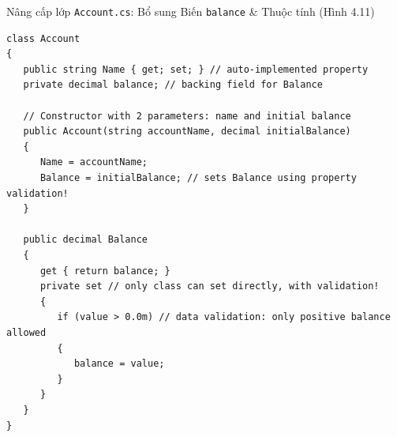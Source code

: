 \documentclass[aspectratio=169, 10pt]{beamer}
\begin{document}
\begin{frame}[fragile]{Nâng cấp lớp \texttt{Account.cs}: Bổ sung Biến \texttt{balance} \& Thuộc tính (Hình 4.11)}
  \begin{tcolorbox}[colback=CodeBg,colframe=UniNavy,title=\textbf{Account.cs with Balance and Validation (Trích Fig. 4.11)},fonttitle=\small\bfseries]
\begin{lstlisting}
class Account
{
   public string Name { get; set; } // auto-implemented property
   private decimal balance; // backing field for Balance

   // Constructor with 2 parameters: name and initial balance
   public Account(string accountName, decimal initialBalance)
   {
      Name = accountName;
      Balance = initialBalance; // sets Balance using property validation!
   }

   public decimal Balance
   {
      get { return balance; }
      private set // only class can set directly, with validation!
      {
         if (value > 0.0m) // data validation: only positive balance allowed
         {
            balance = value;
         }
      }
   }
}
\end{lstlisting}
  \end{tcolorbox}
\end{frame}
\end{document}
